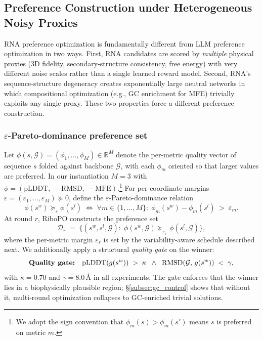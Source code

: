\subsection{Preference Construction under Heterogeneous Noisy Proxies}
\label{subsec:pref_construction}

RNA preference optimization is fundamentally different from LLM preference optimization in two ways. First, RNA candidates are scored by \emph{multiple} physical proxies (3D fidelity, secondary-structure consistency, free energy) with very different noise scales rather than a single learned reward model. Second, RNA's sequence-structure degeneracy \citep{schuster1994rna2dshape} creates exponentially large neutral networks in which compositional optimization (e.g., GC enrichment for MFE) trivially exploits any single proxy. These two properties force a different preference construction.

\subsubsection{$\varepsilon$-Pareto-dominance preference set}
\label{subsubsec:pareto_pref}

Let $\phi(s, \mathcal{G}) = (\phi_1, \dots, \phi_M) \in \mathbb{R}^M$ denote the per-metric quality vector of sequence $s$ folded against backbone $\mathcal{G}$, with each $\phi_m$ oriented so that larger values are preferred. In our instantiation $M=3$ with $\phi = (\text{pLDDT},\, -\text{RMSD},\, -\text{MFE})$.\footnote{We adopt the sign convention that $\phi_m(s) > \phi_m(s')$ means $s$ is preferred on metric $m$.} For per-coordinate margins $\varepsilon = (\varepsilon_1,\dots,\varepsilon_M) \succeq 0$, define the $\varepsilon$-Pareto-dominance relation
\begin{equation}
\phi(s^w) \succeq_{\varepsilon} \phi(s^l) \;\iff\; \forall m \in \{1,\dots,M\}:\; \phi_m(s^w) - \phi_m(s^l) \;>\; \varepsilon_m.
\label{eq:pareto_dom}
\end{equation}
At round $r$, RiboPO constructs the preference set
\begin{equation}
\mathcal{D}_r \;=\; \big\{(s^w, s^l, \mathcal{G}) :\; \phi(s^w, \mathcal{G}) \succeq_{\varepsilon_r} \phi(s^l, \mathcal{G})\big\},
\label{eq:pref_set}
\end{equation}
where the per-metric margin $\varepsilon_r$ is set by the variability-aware schedule described next. We additionally apply a structural \emph{quality gate} on the winner:
\begin{equation}
\text{\textbf{Quality gate:}}\quad \text{pLDDT}(g(s^w)) \;>\; \kappa \;\;\land\;\; \text{RMSD}(\mathcal{G},\, g(s^w)) \;<\; \gamma,
\label{eq:gate}
\end{equation}
with $\kappa = 0.70$ and $\gamma = 8.0\,\text{\AA}$ in all experiments. The gate enforces that the winner lies in a biophysically plausible region; \S\ref{subsec:gc_control} shows that without it, multi-round optimization collapses to GC-enriched trivial solutions.

